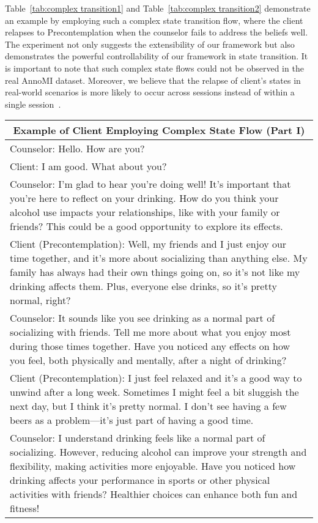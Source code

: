 Table~\ref{tab:complex transition1} and Table~\ref{tab:complex transition2} demonstrate an example by employing such a complex state transition flow, where the client relapses to Precontemplation when the counselor fails to address the beliefs well. The experiment not only suggests the extensibility of our framework but also demonstrates the powerful controllability of our framework in state transition. It is important to note that such complex state flows could not be observed in the real AnnoMI dataset. Moreover, we believe that the relapse of client's states in real-world scenarios is more likely to occur across sessions instead of within a single session~\citep{hashemzadeh2019transtheoretical,prochaska1997transtheoretical,miller2012motivational}.

\begin{table*}[htbp]
\centering
\begin{tabularx}{\textwidth}{X}
\toprule
\multicolumn{1}{c}{\textbf{Example of Client Employing Complex State Flow (Part I)}} \\ \midrule   
Counselor: Hello. How are you? \\
Client: I am good. What about you? \\
Counselor: I'm glad to hear you're doing well! It’s important that you're here to reflect on your drinking. How do you think your alcohol use impacts your relationships, like with your family or friends? This could be a good opportunity to explore its effects. \\
Client {\color{green}(Precontemplation)}: Well, my friends and I just enjoy our time together, and it's more about socializing than anything else. My family has always had their own things going on, so it's not like my drinking affects them. Plus, everyone else drinks, so it's pretty normal, right? \\
Counselor: It sounds like you see drinking as a normal part of socializing with friends. Tell me more about what you enjoy most during those times together. Have you noticed any effects on how you feel, both physically and mentally, after a night of drinking? \\
Client {\color{green}(Precontemplation)}: I just feel relaxed and it’s a good way to unwind after a long week. Sometimes I might feel a bit sluggish the next day, but I think it’s pretty normal. I don’t see having a few beers as a problem—it's just part of having a good time. \\
Counselor: I understand drinking feels like a normal part of socializing. However, reducing alcohol can improve your strength and flexibility, making activities more enjoyable. Have you noticed how drinking affects your performance in sports or other physical activities with friends? Healthier choices can enhance both fun and fitness! \\

\end{tabularx}
\end{table*}

